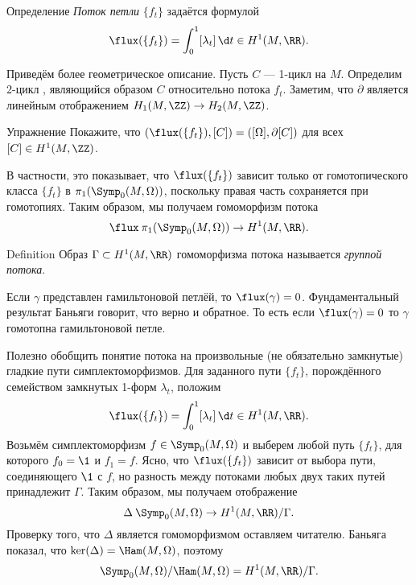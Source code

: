 \begin{ex*}{Определение}
\emph{Поток петли} $\{f_t\}$ задаётся формулой
\index[symb]{$\flux$} 
\[\flux(\{f_t\}) = \int_0^1 [\lambda_t]\,\d t \in H^1(M, \RR).\]
\end{ex*}

Приведём более геометрическое описание.
Пусть $C$ --- 1-цикл на $M$.
Определим 2-цикл , являющийся образом $C$ относительно потока $f_t$. 
Заметим, что $\partial$ является линейным отображением $H_1(M,\ZZ)\to H_2(M,\ZZ)$.

\begin{ex*}{Упражнение}
Покажите, что $(\flux(\{f_t\}), [C]) = ([\Omega], \partial[C])$ для
всех $[C]\in H^1(M,\ZZ)$. 
\end{ex*}

В частности, это показывает, что $\flux(\{f_t\})$ зависит только от гомотопического класса $\{f_t\}$ в $\pi_1 (\Symp_0(M,\Omega))$, поскольку правая часть сохраняется при гомотопиях.
Таким образом, мы получаем гомоморфизм потока
\[\flux\:\pi_1(\Symp_0(M,\Omega))\to H^1(M,\RR).\]

\begin{ex*}{Definition}
Образ $\Gamma \subset H^1(M, \RR)$ гомоморфизма потока называется
\emph{группой потока}. 
\end{ex*}


Если $\gamma$ представлен гамильтоновой петлёй, то $\flux(\gamma) = 0$.
Фундаментальный результат Баньяги \cite{B1} говорит,
что верно и обратное. 
То есть если $\flux(\gamma) = 0$ то $\gamma$ гомотопна гамильтоновой петле.

Полезно обобщить понятие потока на произвольные (не обязательно
замкнутые) гладкие пути симплектоморфизмов. 
Для заданного пути $\{f_t\}$, порождённого семейством замкнутых 1-форм
$\lambda_t$, положим  
\[\flux(\{f_t\})=\int_0^1[\lambda_t]\,\d t\in H^1(M,\RR).\]
Возьмём симплектоморфизм $f \in \Symp_0(M,\Omega)$ и выберем любой
путь $\{f_t\}$, для которого $f_0 = \1$ и $f_1 = f$.
Ясно, что $\flux (\{f_t\})$ зависит от выбора пути, соединяющего $\1$
с $f$, но разность между потоками любых двух таких путей принадлежит
$\Gamma$. 
Таким образом, мы получаем отображение
\[\Delta\:\Symp_0(M,\Omega)\to H^1(M,\RR)/\Gamma.\]
Проверку того, что $\Delta$ является гомоморфизмом оставляем читателю.
Баньяга показал, что $\ker(\Delta) = \Ham(M,\Omega)$, поэтому 
\[\Symp_0(M,\Omega)/\Ham(M,\Omega) = H^1(M, \RR)/\Gamma.\]

